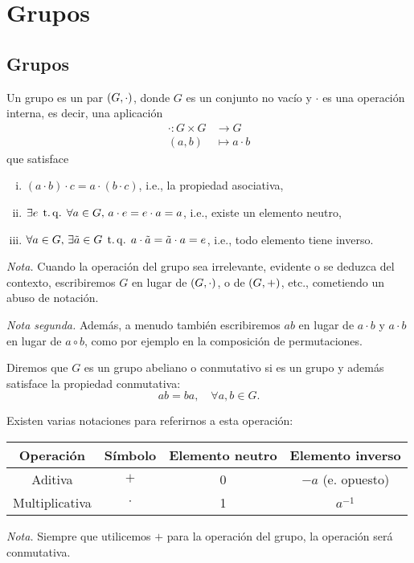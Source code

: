 \chapter{Grupos}

\section{Grupos}

\begin{defi}[grupo]
    Un grupo es un par $\left( G, \cdot \right)$, donde $G$ es un conjunto no vacío y $\cdot$ es una operación interna, es decir, una aplicación
    \[
        \begin{aligned}
            \cdot \colon G \times G &\to G \\
            (a, b) &\mapsto a \cdot b
        \end{aligned}
    \]
    que satisface
    \begin{enumerate}[i)]
        \item $(a\cdot b)\cdot c = a\cdot (b\cdot c)$, i.e., la propiedad asociativa,
        \item $\exists e \operatorname{\;t.q.\;} \forall a \in G, \, a\cdot e = e\cdot a = a$, i.e., existe un elemento neutro,
        \item $\forall a \in G, \, \exists \tilde{a} \in G \operatorname{\;t.q.\;} a \cdot \tilde{a} = \tilde{a}\cdot a = e$, i.e., todo elemento tiene inverso.
    \end{enumerate}
    \emph{Nota.} Cuando la operación del grupo sea irrelevante, evidente o se deduzca del contexto, escribiremos $G$ en lugar de $\left( G, \cdot\right)$, o de $\left( G, +\right)$, etc., cometiendo un abuso de notación.
    
    \vspace{1.15ex}
    
    \noindent \emph{Nota segunda.} Además, a menudo también escribiremos $ab$ en lugar de $a\cdot b$ y $a\cdot b$ en lugar de $a\circ b$, como por ejemplo en la composición de permutaciones.
\end{defi}

\begin{defi}
    Diremos que $G$ es un grupo abeliano o conmutativo si es un grupo y además satisface la propiedad conmutativa:
    \[
        ab = ba, \quad \forall a, b \in G.
    \]
\end{defi}

\begin{obs}
    Existen varias notaciones para referirnos a esta operación:
    \begin{center}
        \begin{tabular}{|c|c|c|c|} \hline
            Operación & S\'imbolo & Elemento neutro & Elemento inverso \\ \hline \hline
            Aditiva & $+$ & 0 & $-a$ (e. opuesto) \\ \hline
            Multiplicativa & $\cdot$ & 1 & $a^{-1}$ \\ \hline
        \end{tabular}
    \end{center}
    \emph{Nota.} Siempre que utilicemos $+$ para la operación del grupo, la operación será conmutativa.
\end{obs}

